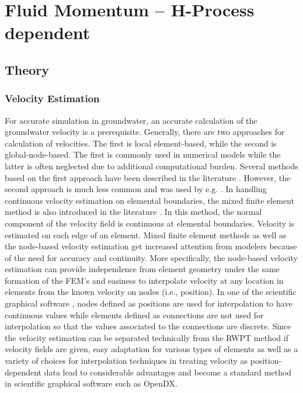 \chapter{Fluid Momentum -- H-Process dependent}

\section{Theory}
\subsection{Velocity Estimation}\label{SS:VELOCITY}
For accurate simulation in groundwater, an accurate calculation of the groundwater velocity is a prerequisite. Generally, there are two approaches for calculation of velocities. The first is local element-based, while the second is global-node-based. The first is commonly used in numerical models while the latter is often neglected due to additional computational burden. Several methods based on the first approach have been described in the literature \cite{cV87,hD98,pK96,pF98}. However, the second approach is much less common and was used by e.g. \cite{gY81,rM94,cP04}. In handling continuous velocity estimation on elemental boundaries, the mixed finite element method is also introduced in the literature \cite{rM94,cC92}. In this method, the normal component of the velocity field is continuous at elemental boundaries. Velocity is estimated on each edge of an element. Mixed finite element methods \cite{eS04,jK05} as well as the node-based velocity estimation get increased attention from modelers because of the need for accuracy and continuity. More specifically, the node-based velocity estimation can provide independence from element geometry under the same formation of the FEM's and easiness to interpolate velocity at any location in elements from the known velocity on nodes (i.e., position). In one of the scientific graphical software \cite{OD97}, nodes defined as positions are used for interpolation to have continuous values while elements defined as connections are not used for interpolation so that the values associated to the connections are discrete. Since the velocity estimation can be separated technically from the RWPT method if velocity fields are given, easy adaptation for various types of elements as well as a variety of choices for interpolation techniques in treating velocity as position-dependent data lead to considerable advantages and become a standard method in scientific graphical software such as OpenDX\cite{OD97}.

